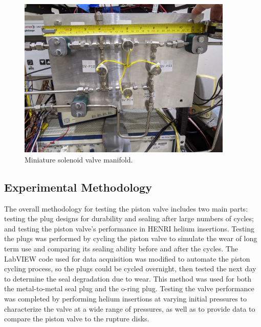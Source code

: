 %
\begin{figure}[htbp]
    \vspace{16pt}
    \centering
    \includegraphics[width=4.032in, height=3.024in]{experiment/photos/SV_manifold.jpg}
    \caption{Miniature solenoid valve manifold.}
    \label{fig:sv manifold}
    \vspace{16pt}
\end{figure}
%




\subsection{Experimental Methodology} \label{s:methodology}


The overall methodology for testing the piston valve includes two main parts: testing the plug designs for durability and sealing after large numbers of cycles; and testing the piston valve's performance in HENRI helium insertions. Testing the plugs was performed by cycling the piston valve to simulate the wear of long term use and comparing its sealing ability before and after the cycles. The LabVIEW code used for data acquisition was modified to automate the piston cycling process, so the plugs could be cycled overnight, then tested the next day to determine the seal degradation due to wear. This method was used for both the metal-to-metal seal plug and the o-ring plug. Testing the valve performance was completed by performing helium insertions at varying initial pressures to characterize the valve at a wide range of pressures, as well as to provide data to compare the piston valve to the rupture disks. 